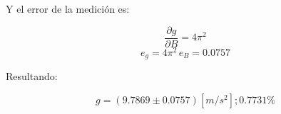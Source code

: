 \documentclass[letter,11pt]{article}
\begin{document}
Y el error de la medición es:

\begin{equation*}
    \frac{\partial g}{\partial B} = 4 \pi^2
\end{equation*}
\begin{equation*}
    e_g = 4 \pi^2\,e_B = 0.0757
\end{equation*}
\vspace{0.10cm}

Resultando:

\begin{equation*}
    g = (9.7869 \pm 0.0757) [m/s^2]; 0.7731\%
\end{equation*}
\vspace{0.10cm}
\end{document}
